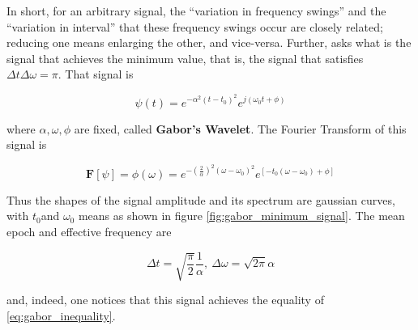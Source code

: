 	In short, for an arbitrary signal, the ``variation in frequency swings'' and the ``variation in interval'' that these frequency swings occur are closely related; reducing one means enlarging the other, and vice-versa. Further, \cite{Gabor1946TheoryOC} asks what is the signal that achieves the minimum value, that is, the signal that satisfies $\Delta t\Delta \omega = \pi$. That signal is

\begin{equation} \psi(t) = e^{-\alpha^2\left(t - t_0\right)^2}e^{j\left(\omega_0 t + \phi\right)} \label{eq:optimal_signal}\end{equation}

	\noindent where $\alpha,\omega,\phi$ are fixed, called \textbf{Gabor's Wavelet}. The Fourier Transform of this signal is

\begin{equation} \mathbf{F}\left[\psi\right] = \phi\left(\omega\right) = e^{-\left(\frac{2}{\alpha}\right)^2 \left(\omega - \omega_0\right)^2}e^{\left[-t_0\left(\omega - \omega_0\right) + \phi\right]} \label{eq:optimal_signal_fourier}\end{equation}

	Thus the shapes of the signal amplitude and its spectrum are gaussian curves, with $t_0$and $\omega_0$ means as shown in figure \ref{fig:gabor_minimum_signal}. The mean epoch and effective frequency are

\begin{equation} \Delta t = \sqrt{\dfrac{\pi}{2}}\dfrac{1}{\alpha},\ \Delta\omega = \sqrt{2\pi} \alpha \end{equation}

	\noindent and, indeed, one notices that this signal achieves the equality of \eqref{eq:gabor_inequality}.

